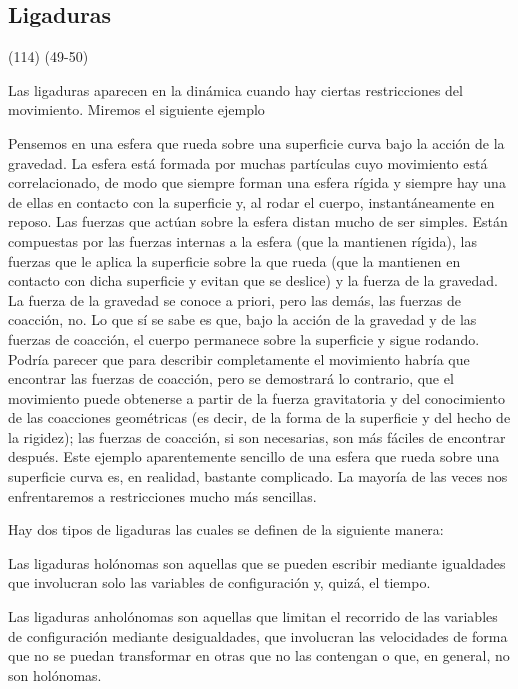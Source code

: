 \subsection{Ligaduras}(114) (49-50) 

Las ligaduras aparecen en la dinámica cuando hay ciertas restricciones del movimiento. Miremos el siguiente ejemplo 
\begin{example}
  Pensemos en una esfera que rueda sobre una superficie curva bajo la acción de la gravedad. La esfera está formada por muchas partículas cuyo movimiento está correlacionado, de modo que siempre forman una esfera rígida y siempre hay una de ellas en contacto con la superficie y, al rodar el cuerpo, instantáneamente en reposo. Las fuerzas que actúan sobre la esfera distan mucho de ser simples. Están compuestas por las fuerzas internas a la esfera (que la mantienen rígida), las fuerzas que le aplica la superficie sobre la que rueda (que la mantienen en contacto con dicha superficie y evitan que se deslice) y la fuerza de la gravedad. La fuerza de la gravedad se conoce a priori, pero las demás, las fuerzas de coacción, no. Lo que sí se sabe es que, bajo la acción de la gravedad y de las fuerzas de coacción, el cuerpo permanece sobre la superficie y sigue rodando. Podría parecer que para describir completamente el movimiento habría que encontrar las fuerzas de coacción, pero se demostrará lo contrario, que el movimiento puede obtenerse a partir de la fuerza gravitatoria y del conocimiento de las coacciones geométricas (es decir, de la forma de la superficie y del hecho de la rigidez); las fuerzas de coacción, si son necesarias, son más fáciles de encontrar después. Este ejemplo aparentemente sencillo de una esfera que rueda sobre una superficie curva es, en realidad, bastante complicado. La mayoría de las veces nos enfrentaremos a restricciones mucho más sencillas.
\end{example}

Hay dos tipos de ligaduras las cuales se definen de la siguiente manera:

\begin{definition}
  Las ligaduras holónomas son aquellas que se pueden escribir mediante igualdades que involucran solo las variables de configuración y, quizá, el tiempo.
\end{definition}

\begin{definition}
  Las ligaduras anholónomas son aquellas que limitan el recorrido de las variables de configuración mediante desigualdades, que involucran las velocidades de forma que no se puedan transformar en otras que no las contengan o que, en general, no son holónomas.
\end{definition}



